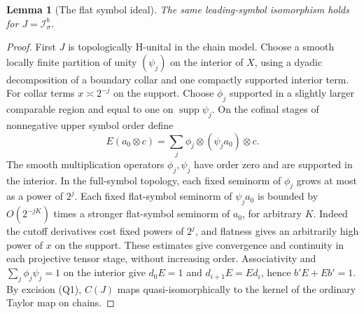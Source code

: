\documentclass[11pt,oneside,reqno]{article}
\newcommand{\Isb}{\mathcal I^b_\sigma}
\theoremstyle{plain}
\newtheorem{lemma}[theorem]{Lemma}
\theoremstyle{definition}
\theoremstyle{remark}
\begin{document}
\begin{lemma}[The flat symbol ideal]
\label{lem:mixed-flat}
The same leading-symbol isomorphism holds for \(J=\Isb\).
\end{lemma}

\begin{proof}
First \(J\) is topologically H-unital in the chain model.
Choose a smooth locally finite partition of unity \((\psi_j)\)
on the interior of \(X\), using a dyadic decomposition of a
boundary collar and one compactly supported interior term.
For collar terms \(x\asymp 2^{-j}\) on the support. Choose
\(\phi_j\) supported in a slightly larger comparable region
and equal to one on \(\operatorname{supp}\psi_j\).
On the cofinal stages of nonnegative upper symbol order define
\[
 E(a_0\otimes c)=\sum_j\phi_j\otimes(\psi_j a_0)\otimes c .
\]
The smooth multiplication operators \(\phi_j,\psi_j\) have
order zero and are supported in the interior. In the full-symbol
topology, each fixed seminorm of \(\phi_j\) grows at most as a
power of \(2^j\). Each fixed flat-symbol seminorm of
\(\psi_j a_0\) is bounded by \(O(2^{-jK})\) times a stronger
flat-symbol seminorm of \(a_0\), for arbitrary \(K\). Indeed
the cutoff derivatives cost fixed powers of \(2^j\), and
flatness gives an arbitrarily high power of \(x\) on the
support. These estimates give convergence and continuity in
each projective tensor stage, without increasing order.
Associativity and \(\sum_j\phi_j\psi_j=1\) on the interior
give \(d_0 E=1\) and \(d_{i+1}E=Ed_i\), hence
\(b'E+Eb'=1\). By excision (Q1), \(C(J)\) maps
quasi-isomorphically to the kernel of the ordinary Taylor
map on chains.


\end{proof}
\end{document}
